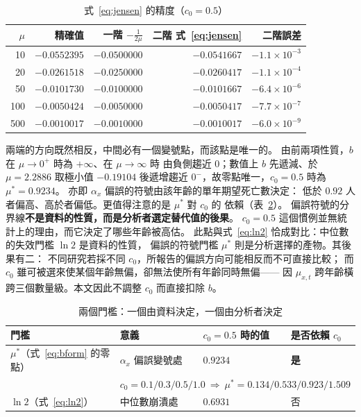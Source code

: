 \documentclass[UTF8, fontset=macnew, a4paper, 12pt]{ctexart}
\begin{document}
\begin{table}[H]
\centering
\caption{式~\eqref{eq:jensen} 的精度（$c_0=0.5$）}
\small
\begin{tabular}{rrrrr}
\toprule
$\mu$ & 精確值 & 一階 $-\frac{1}{2\mu}$ & 二階 式~\eqref{eq:jensen} & 二階誤差\\
\midrule
10   & $-0.0552395$ & $-0.0500000$ & $-0.0541667$ & $-1.1\times10^{-3}$\\
20   & $-0.0261518$ & $-0.0250000$ & $-0.0260417$ & $-1.1\times10^{-4}$\\
50   & $-0.0101730$ & $-0.0100000$ & $-0.0101667$ & $-6.4\times10^{-6}$\\
100  & $-0.0050424$ & $-0.0050000$ & $-0.0050417$ & $-7.7\times10^{-7}$\\
500  & $-0.0010017$ & $-0.0010000$ & $-0.0010017$ & $-6.0\times10^{-9}$\\
\bottomrule
\end{tabular}
\label{tab:asym}
\end{table}

兩端的方向既然相反，中間必有一個變號點，而該點是唯一的。
由前兩項性質，$b$ 在 $\mu\to0^{+}$ 時為 $+\infty$、在 $\mu\to\infty$ 時
由負側趨近 $0$；數值上 $b$ 先遞減、於 $\mu=2.2886$ 取極小值 $-0.19104$
後遞增趨近 $0^{-}$，故零點唯一，$c_0=0.5$ 時為 $\mu^\ast=0.9234$。
亦即 $\alpha_x$ 偏誤的符號由該年齡的單年期望死亡數決定：
低於 $0.92$ 人者偏高、高於者偏低。更值得注意的是 $\mu^\ast$ 對 $c_0$ 的
依賴（表~\ref{tab:mustar}）。
偏誤符號的分界線\textbf{不是資料的性質，而是分析者選定替代值的後果}。
$c_0=0.5$ 這個慣例並無統計上的理由，而它決定了哪些年齡被高估。
此點與式~\eqref{eq:ln2} 恰成對比：中位數的失效門檻 $\ln 2$ 是資料的性質，
偏誤的符號門檻 $\mu^\ast$ 則是分析選擇的產物。其後果有二：
不同研究若採不同 $c_0$，所報告的偏誤方向可能相反而不可直接比較；
而 $c_0$ 雖可被選來使某個年齡無偏，卻無法使所有年齡同時無偏——
因 $\mu_{x,t}$ 跨年齡橫跨三個數量級。本文因此不調整 $c_0$ 而直接扣除 $b$。

\begin{table}[H]
\centering
\caption{兩個門檻：一個由資料決定，一個由分析者決定}
\small
\begin{tabular}{llll}
\toprule
門檻 & 意義 & $c_0=0.5$ 時的值 & 是否依賴 $c_0$\\
\midrule
$\mu^\ast$（式~\eqref{eq:bform} 的零點） & $\alpha_x$ 偏誤變號處 & $0.9234$ & \textbf{是}\\
 & \multicolumn{3}{l}{\quad $c_0=0.1/0.3/0.5/1.0\ \Rightarrow\ \mu^\ast=0.134/0.533/0.923/1.509$}\\
$\ln 2$（式~\eqref{eq:ln2}） & 中位數崩潰處 & $0.6931$ & 否\\
\bottomrule
\end{tabular}
\label{tab:mustar}
\end{table}
\end{document}
